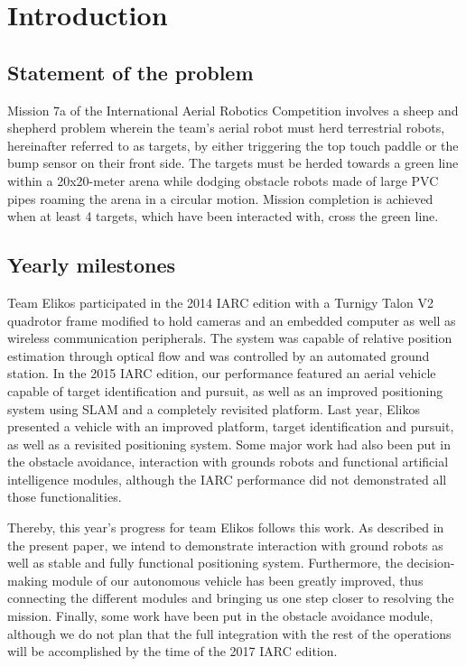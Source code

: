 \section*{Introduction} \label{sec:intro}

\subsection*{Statement of the problem} \label{subsec:intro-problem}

Mission 7a of the International Aerial Robotics Competition involves a sheep and shepherd problem wherein the team’s aerial robot must herd terrestrial robots, hereinafter referred to as targets, by either triggering the top touch paddle or the bump sensor on their front side. The targets must be herded towards a green line within a 20x20-meter arena while dodging obstacle robots made of large PVC pipes roaming the arena in a circular motion. Mission completion is achieved when at least 4 targets, which have been interacted with, cross the green line.

\subsection*{Yearly milestones} \label{subsec:intro-milestones}

Team Elikos participated in the 2014 IARC edition with a Turnigy Talon V2 quadrotor frame modified to hold cameras and an embedded computer as well as wireless communication peripherals. The system was capable of relative position estimation through optical flow and was controlled by an automated ground station. 
In the 2015 IARC edition, our performance featured an aerial vehicle capable of target identification and pursuit, as well as an improved positioning system using SLAM and a completely revisited platform. 
Last year, Elikos presented a vehicle with an improved platform, target identification and pursuit, as well as a revisited positioning system. Some major work had also been put in the obstacle avoidance, interaction with grounds robots and functional artificial intelligence modules, although the IARC performance did not demonstrated all those functionalities.

Thereby, this year’s progress for team Elikos follows this work. As described in the present paper, we intend to demonstrate interaction with ground robots as well as stable and fully functional positioning system. Furthermore, the decision-making module of our autonomous vehicle has been greatly improved, thus connecting the different modules and bringing us one step closer to resolving the mission. Finally, some work have been put in the obstacle avoidance module, although we do not plan that the full integration with the rest of the operations will be accomplished by the time of the 2017 IARC edition.


